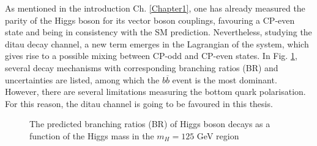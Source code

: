 As mentioned in the introduction Ch. \ref{Chapter1}, one has already measured the parity of the Higgs boson for its vector boson couplings, favouring a CP-even state and being in consistency with the SM prediction. Nevertheless, studying the ditau decay channel, a new term emerges in the Lagrangian of the system, which gives rise to a possible mixing between CP-odd and CP-even states. In Fig. \ref{fig:Higgs_decays}, several decay mechanisms with corresponding branching ratios (BR) and uncertainties are listed, among which the $b\overline{b}$ event is the most dominant. However, there are several limitations measuring the bottom quark polarisation. For this reason, the ditau channel is going to be favoured in this thesis.
\begin{figure}[h]
	\centering
	\caption{The predicted branching ratios (BR) of Higgs boson decays as a function of the Higgs mass in the $m_H = 125$ GeV region \parencite{Higgs_decays}}
	\label{fig:Higgs_decays}
\end{figure}
